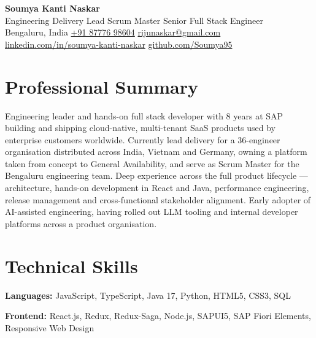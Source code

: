 \documentclass[11pt,a4paper]{article}
\begin{document}
\begin{center}
{\LARGE\bfseries Soumya Kanti Naskar}\\[3pt]
{Engineering Delivery Lead \textbar{} Scrum Master \textbar{} Senior Full Stack Engineer}\\[4pt]
Bengaluru, India \textbar{} \href{tel:+918777698604}{+91 87776 98604} \textbar{}
\href{mailto:rijunaskar@gmail.com}{rijunaskar@gmail.com}\\[2pt]
\href{https://www.linkedin.com/in/soumya-kanti-naskar}{linkedin.com/in/soumya-kanti-naskar}
\textbar{} \href{https://github.com/Soumya95}{github.com/Soumya95}
\end{center}

\section{Professional Summary}

Engineering leader and hands-on full stack developer with 8 years at SAP building and shipping
cloud-native, multi-tenant SaaS products used by enterprise customers worldwide. Currently lead
delivery for a 36-engineer organisation distributed across India, Vietnam and Germany, owning a
platform taken from concept to General Availability, and serve as Scrum Master for the Bengaluru
engineering team. Deep experience across the full product
lifecycle --- architecture, hands-on development in React and Java, performance engineering, release
management and cross-functional stakeholder alignment. Early adopter of AI-assisted engineering,
having rolled out LLM tooling and internal developer platforms across a product organisation.

\section{Technical Skills}

\textbf{Languages:} JavaScript, TypeScript, Java 17, Python, HTML5, CSS3, SQL

\textbf{Frontend:} React.js, Redux, Redux-Saga, Node.js, SAPUI5, SAP Fiori Elements, Responsive Web Design
\end{document}
